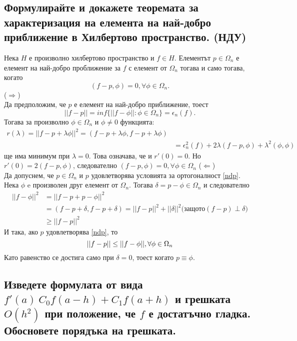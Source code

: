\documentclass[12pt]{article}
\numberwithin{equation}{subsection}
\numberwithin{theorem}{subsection}
\numberwithin{definition}{subsection}
\numberwithin{corollary}{subsection}
\begin{document}
\subsection{Формулирайте и докажете теоремата за характеризация на елемента на най-добро приближение в Хилбертово пространство. (НДУ)}
  \theorem
  Нека $H$ е произволно хилбертово пространство и $f\in H$. Елементът $p\in\Omega_n$ е елемент на най-добро проближение за $f$ с елемент от $\Omega_n$ тогава и само тогава, когато
  \begin{equation}\label{ndp}
    (f-p,\phi)=0, \forall\phi\in\Omega_n.
  \end{equation}
  \proof
  ($\Rightarrow$)\\
  Да предположим, че $p$ е елемент на най-добро приближение, тоест
  \begin{equation*}
    ||f-p||=inf\{||f-\phi||:\phi\in \Omega_n\} = \epsilon_n(f).
  \end{equation*}
  Тогава за произволно $\phi\in\Omega_n$ и $\phi\neq0$ функцията:
  \begin{align*}
    r(\lambda)=||f-p+\lambda\phi||^2=(f-p+\lambda\phi,f-p+\lambda\phi)\\
    &=\epsilon_n^2(f) + 2\lambda(f-p,\phi) +\lambda^2(\phi,\phi)
  \end{align*}
  ще има минимум при $\lambda=0$. Това означава, че и $r'(0)=0$. Но $r'(0)=2(f-p,\phi)$, следователно
  $(f-p,\phi)=0, \forall\phi\in\Omega_n$
  ($\Leftarrow$)\\
  Да допуснем, че $p\in\Omega_n$ и $p$ удовлетворява условията за ортогоналност \ref{ndp}. Нека $\phi$ e произволен друг елемент от $\Omega_n$. Тогава $\delta=p-\phi\in\Omega_n$ и следователно
  \begin{align*}
    ||f-\phi||^2&=||f-p+p-\phi||^2\\&=(f-p+\delta,f-p+\delta)=||f-p||^2+||\delta||^2 \text{(защото} (f-p)\perp\delta)\\
    &\geq||f-p||^2
  \end{align*}
  И така, ако $p$ удовлетворява \ref{ndp}, то
  \begin{equation*}
    ||f-p||\leq||f-\phi||,\hfil\forall\phi\in\Omega_n
  \end{equation*}
  Като равенство се достига само при $\delta=0$, тоест когато $p\equiv\phi$.
\subsection{Изведете формулата от вида $f'(a) ~ C_0 f(a - h) + C_1 f(a + h)$ и грешката $O(h^2)$ при положение, че $f$ е достатъчно гладка.
        Обосновете порядъка на грешката.}
\end{document}
